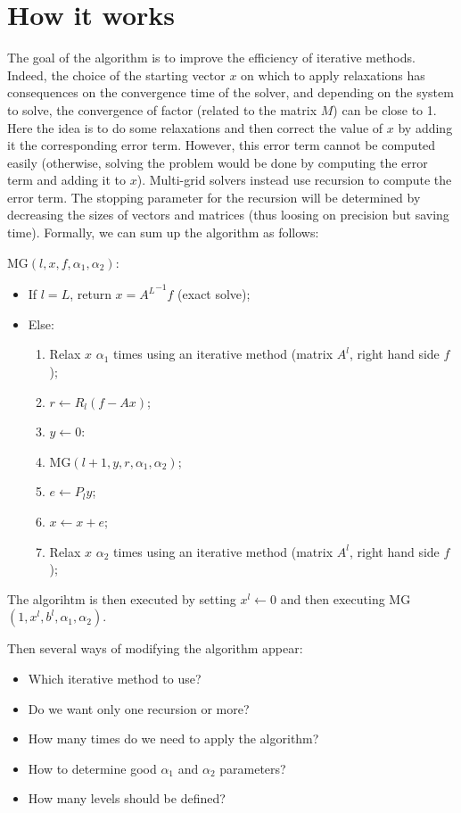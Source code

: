 \documentclass[a4paper,10pt]{article}
\begin{document}
\section{How it works}

  The goal of the algorithm is to improve the efficiency of iterative methods. Indeed, the choice of the starting vector $x$ on which to apply relaxations has consequences on the convergence
  time of the solver, and depending on the system to solve, the convergence of factor (related to the matrix $M$) can be close to 1.\\
  Here the idea is to do some relaxations and then correct the value of $x$ by adding it the corresponding error term. However, this error term cannot be computed easily (otherwise,
  solving the problem would be done by computing the error term and adding it to $x$). Multi-grid solvers instead use recursion to compute the error term. The stopping parameter for the
  recursion will be determined by decreasing the sizes of vectors and matrices (thus loosing on precision but saving time).
  Formally, we can sum up the algorithm as follows:
  
  MG$(l,x,f,\alpha_1,\alpha_2)$:
  \begin{itemize}
    \item If $l = L$, return $x = {A^L}^{-1} f$ (exact solve);
    \item Else:
    \begin{enumerate}
      \item Relax $x$ $\alpha_1$ times using an iterative method (matrix $A^l$, right hand side $f$);
      \item $r \leftarrow R_l ( f - Ax )$;
      \item $y \leftarrow 0$:
      \item MG$(l+1,y,r,\alpha_1,\alpha_2)$;
      \item $e \leftarrow P_{l} y$;
      \item $x \leftarrow x+e$;
      \item Relax $x$ $\alpha_2$ times using an iterative method (matrix $A^l$, right hand side $f$);
   \end{enumerate}
  \end{itemize}
  The algorihtm is then executed by setting $x^l \leftarrow 0$ and then executing MG$(1,x^l,b^l,\alpha_1,\alpha_2)$.

  Then several ways of modifying the algorithm appear:
  \begin{itemize}
   \item Which iterative method to use?
   \item Do we want only one recursion or more?
   \item How many times do we need to apply the algorithm?
   \item How to determine good $\alpha_1$ and $\alpha_2$ parameters?
   \item How many levels should be defined?
  \end{itemize}
\end{document}
